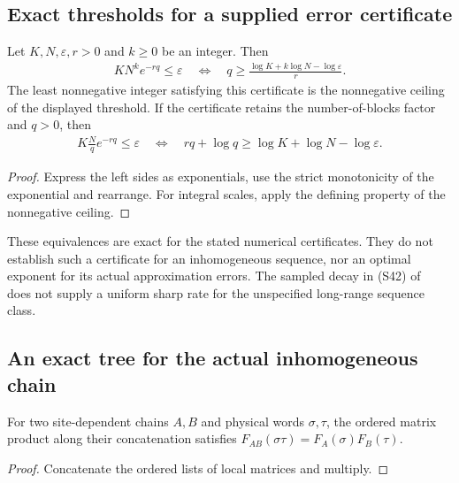 \subsection{Exact thresholds for a supplied error certificate}

\begin{lemma}
    \label{lem:ldp_exact_exponential_blocking_threshold}
    \leanok
    Let $K,N,\varepsilon,r>0$ and $k\ge0$ be an integer. Then
    \begin{align*}
        KN^k e^{-rq}\le\varepsilon
        \quad\Longleftrightarrow\quad
        q\ge\frac{\log K+k\log N-\log\varepsilon}{r}.
    \end{align*}
    The least nonnegative integer satisfying this certificate is the
    nonnegative ceiling of the displayed threshold. If the certificate
    retains the number-of-blocks factor and $q>0$, then
    \begin{align*}
        K\frac Nq e^{-rq}\le\varepsilon
        \quad\Longleftrightarrow\quad
        rq+\log q\ge\log K+\log N-\log\varepsilon.
    \end{align*}
\end{lemma}
\begin{proof}\leanok
    Express the left sides as exponentials, use the strict monotonicity
    of the exponential and rearrange. For integral scales, apply the
    defining property of the nonnegative ceiling.
\end{proof}

These equivalences are exact for the stated numerical certificates.
They do not establish such a certificate for an inhomogeneous sequence,
nor an optimal exponent for its actual approximation errors.
The sampled decay in (S42) of~\cite{Malz2024Preparation} does not supply
a uniform sharp rate for the unspecified long-range sequence class.

\subsection{An exact tree for the actual inhomogeneous chain}

\begin{lemma}
    \label{lem:ldp_chain_eval_append}
    \leanok
    For two site-dependent chains $A,B$ and physical words $\sigma,\tau$,
    the ordered matrix product along their concatenation satisfies
    $F_{AB}(\sigma\tau)=F_A(\sigma)F_B(\tau)$.
\end{lemma}
\begin{proof}\leanok
    Concatenate the ordered lists of local matrices and multiply.
\end{proof}

